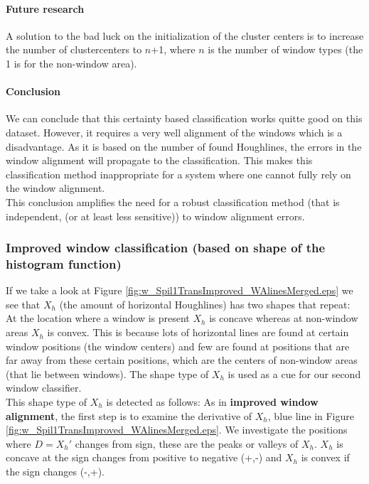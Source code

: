 \paragraph{Future research}
A solution to the bad luck on the initialization of the cluster centers 
is to increase the number of clustercenters to $n$+1, 
where $n$ is the number of window types (the 1 is for the non-window area).


\paragraph{Conclusion}
We can conclude that this certainty based classification works quitte good on
this dataset.  However, it requires a very well alignment of the windows which
is a disadvantage.  As it is based on the number of found Houghlines, the
errors in the window alignment will propagate to the classification.  This
makes this classification method inappropriate for a system where one cannot
fully rely on the window alignment.  \\
This conclusion amplifies the need for a robust classification method (that is
independent, (or at least less sensitive)) to window alignment errors.


\subsubsection{Improved window classification (based on shape of the histogram function)}
If we take a look at Figure \ref{fig:w_Spil1TransImproved_WAlinesMerged.eps}
we see that $X_h$ (the amount of horizontal Houghlines) has two shapes that
repeat:  At the location where a window is present $X_h$ is concave whereas at
non-window areas $X_h$ is convex. This is because lots of
horizontal lines are found at certain window positions (the window centers) and few
are found at positions that are far away from these certain positions, which are the
centers of non-window areas (that lie between windows).  The shape type of $X_h$ is
used as a cue for our second window classifier.\\

This shape type of $X_h$ is detected as follows:
As in \textbf{improved window alignment}, the first step is to examine the
derivative of $X_h$, blue line in Figure
\ref{fig:w_Spil1TransImproved_WAlinesMerged.eps}.  We investigate the positions
where $D=X_{h}'$ changes from sign, these are the peaks or valleys of $X_h$.
$X_h$ is concave at the sign changes from positive to negative (+,-) and $X_h$
is convex if the sign changes (-,+).\\

